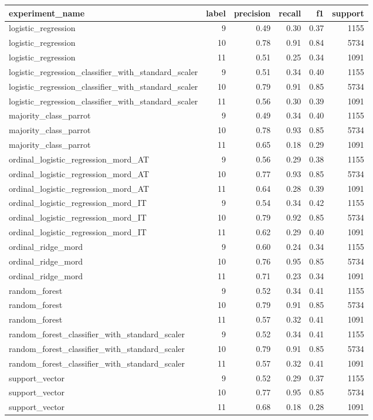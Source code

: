 \begin{tabular}{lrrrrr}
\toprule
experiment_name & label & precision & recall & f1 & support \\
\midrule
logistic_regression & 9 & 0.49 & 0.30 & 0.37 & 1155 \\
logistic_regression & 10 & 0.78 & 0.91 & 0.84 & 5734 \\
logistic_regression & 11 & 0.51 & 0.25 & 0.34 & 1091 \\
logistic_regression_classifier_with_standard_scaler & 9 & 0.51 & 0.34 & 0.40 & 1155 \\
logistic_regression_classifier_with_standard_scaler & 10 & 0.79 & 0.91 & 0.85 & 5734 \\
logistic_regression_classifier_with_standard_scaler & 11 & 0.56 & 0.30 & 0.39 & 1091 \\
majority_class_parrot & 9 & 0.49 & 0.34 & 0.40 & 1155 \\
majority_class_parrot & 10 & 0.78 & 0.93 & 0.85 & 5734 \\
majority_class_parrot & 11 & 0.65 & 0.18 & 0.29 & 1091 \\
ordinal_logistic_regression_mord_AT & 9 & 0.56 & 0.29 & 0.38 & 1155 \\
ordinal_logistic_regression_mord_AT & 10 & 0.77 & 0.93 & 0.85 & 5734 \\
ordinal_logistic_regression_mord_AT & 11 & 0.64 & 0.28 & 0.39 & 1091 \\
ordinal_logistic_regression_mord_IT & 9 & 0.54 & 0.34 & 0.42 & 1155 \\
ordinal_logistic_regression_mord_IT & 10 & 0.79 & 0.92 & 0.85 & 5734 \\
ordinal_logistic_regression_mord_IT & 11 & 0.62 & 0.29 & 0.40 & 1091 \\
ordinal_ridge_mord & 9 & 0.60 & 0.24 & 0.34 & 1155 \\
ordinal_ridge_mord & 10 & 0.76 & 0.95 & 0.85 & 5734 \\
ordinal_ridge_mord & 11 & 0.71 & 0.23 & 0.34 & 1091 \\
random_forest & 9 & 0.52 & 0.34 & 0.41 & 1155 \\
random_forest & 10 & 0.79 & 0.91 & 0.85 & 5734 \\
random_forest & 11 & 0.57 & 0.32 & 0.41 & 1091 \\
random_forest_classifier_with_standard_scaler & 9 & 0.52 & 0.34 & 0.41 & 1155 \\
random_forest_classifier_with_standard_scaler & 10 & 0.79 & 0.91 & 0.85 & 5734 \\
random_forest_classifier_with_standard_scaler & 11 & 0.57 & 0.32 & 0.41 & 1091 \\
support_vector & 9 & 0.52 & 0.29 & 0.37 & 1155 \\
support_vector & 10 & 0.77 & 0.95 & 0.85 & 5734 \\
support_vector & 11 & 0.68 & 0.18 & 0.28 & 1091 \\
\bottomrule
\end{tabular}
